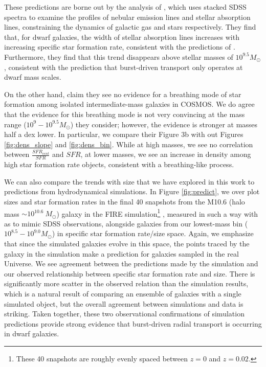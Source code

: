 \documentclass[iop]{emulateapj}
\begin{document}
These predictions are borne out by the analysis of \cite{Cicone16}, which uses stacked SDSS spectra to examine the profiles of nebular emission lines and stellar absorption lines, constraining the dynamics of galactic gas and stars respectively. They find that, for dwarf galaxies, the width of stellar absorption lines increases with increasing specific star formation rate, consistent with the predictions of \cite{El-Badry17}. Furthermore, they find that this trend disappears above stellar masses of $10^{9.5} M_{\odot}$, consistent with the prediction that burst-driven transport only operates at dwarf mass scales.

On the other hand, \cite{Patel18} claim they see no evidence for a breathing mode of star formation among isolated intermediate-mass galaxies in COSMOS. We do agree that the evidence for this breathing mode is not very convincing at the mass range ($10^{9}-10^{9.5} M_{\odot}$) they consider; however, the evidence is stronger at masses half a dex lower. In particular, we compare their Figure 3b with out Figures \ref{fig:dens_slope} and \ref{fig:dens_bin}. While at high masses, we see no correlation between $\frac{SFR_{cent}}{SFR}$ and $SFR$, at lower masses, we see an increase in density among high star formation rate objects, consistent with a breathing-like process.

We can also compare the trends with size that we have explored in this work to predictions from hydrodynamical simulations. In Figure \ref{fig:predict}, we over plot sizes and star formation rates in the final 40 snapshots from the M10.6 (halo mass $\sim 10^{10.6} \  M_{\odot}$) galaxy in the FIRE simulation\footnote{These 40 snapshots are roughly evenly spaced between $z=0$ and $z=0.02$.} \citep{EB17}, measured in such a way with as to mimic SDSS observations, alongside galaxies from our lowest-mass bin ($10^{8.5}-10^{9.0} M_{\odot}$) in specific star formation rate/size space. Again, we emphasize that since the simulated galaxies evolve in this space, the points traced by the galaxy in the simulation make a prediction for galaxies sampled in the real Universe. We see agreement between the predictions made by the simulation and our observed relationship between specific star formation rate and size. There is significantly more scatter in the observed relation than the simulation results, which is a natural result of comparing an ensemble of galaxies with a single simulated object, but the overall agreement between simulations and data is striking. Taken together, these two observational confirmations of simulation predictions provide strong evidence that burst-driven radial transport is occurring in dwarf galaxies.
\end{document}
